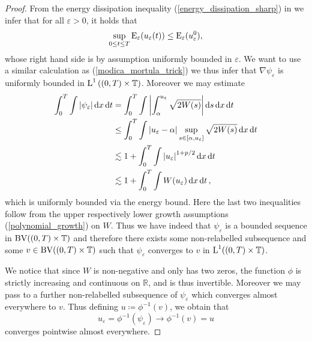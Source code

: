 \begin{proof}
	From the energy dissipation inequality (\ref{energy_dissipation_sharp}) in  we infer that for all $ \varepsilon > 0 $, it holds that
	\begin{equation}
		\label{unif_bound_on_energies}
		\sup_{ 0 \leq t \leq T }
			\operatorname{E}_{ \varepsilon } ( u_{ \varepsilon } ( t ) ) 
		\leq
		\operatorname{E}_{ \varepsilon } ( u_{ \varepsilon}^{ 0 } ),
	\end{equation}
	whose right hand side is by assumption uniformly bounded in $ \varepsilon $.
	We want to use a similar calculation as (\ref{modica_mortula_trick}) we thus infer that $ \nabla \psi_{ \varepsilon } $ is uniformly bounded in $ \operatorname{L}^{ 1 } \left( ( 0 , T ) \times \operatorname{\mathbb{T}} \right) $.
	Moreover we may estimate
	\begin{align}
		\int_{ 0 }^{ T }
			\int
				\abs{ \psi_{ \varepsilon } }
			\dd{ x }
		\dd{ t }
		& =
		\int_{ 0 }^{ T }
			\int
				\abs{
					\int_{ \alpha }^{ u_{ \varepsilon } }
						\sqrt{ 2 W ( s ) }
				}
					\dd{ s }
			\dd{ x }
		\dd{ t }
		\notag
		\\
		& \leq
		\int_{ 0 }^{ T }
			\int
				\abs{ u_{ \varepsilon } - \alpha }
				\sup_{ s \in [ \alpha, u_{ \varepsilon } ] }
					\sqrt{ 2 W ( s ) }
			\dd{ x }
		\dd{ t }
		\notag
		\\
		& \lesssim
		1 + 
		\int_{ 0 }^{ T }
			\int
				\abs{ u_{ \varepsilon } }^{ 1 + p/ 2 }
			\dd{ x }
		\dd{ t }
		\notag
		\\
		& \lesssim
		1 + 
		\int_{ 0 }^{ T }
			\int
				W ( u_{ \varepsilon } )
			\dd{ x }
		\dd{ t },
		\label{l1_estimate_for_psi_epsilon}
	\end{align}
	which is uniformly bounded via the energy bound. Here the last two inequalities follow from the upper respectively lower growth assumptions (\ref{polynomial_growth}) on $ W $. Thus we have indeed that $ \psi_{ \varepsilon } $ is a bounded sequence in $ \operatorname{BV}( ( 0 , T ) \times \operatorname{\mathbb{T}} ) $ and therefore there exists some non-relabelled subsequence and some $ v \in \operatorname{BV} ( ( 0 , T ) \times \operatorname{\mathbb{T}} ) $ such that $ \psi_{ \varepsilon } $ converges to $ v $ in $ \operatorname{L}^{ 1 } ( ( 0 , T ) \times \operatorname{\mathbb{T}} ) $.
	
	We notice that since $ W $ is non-negative and only has two zeros, the function $ \phi $ is strictly increasing and continuous on $ \mathbb{ R } $, and is thus invertible. Moreover we may pass to a further non-relabelled subsequence of $ \psi_{ \varepsilon } $ which converges almost everywhere to $ v $. 
	Thus defining $ u \coloneqq \phi^{ - 1 } ( v ) $, we obtain that
	\begin{equation*}
		u_{ \varepsilon } = \phi^{ - 1 } ( \psi_{ \varepsilon } ) \to \phi^{ - 1 } ( v ) = u
	\end{equation*}
	converges pointwise almost everywhere.
	

\end{proof}
